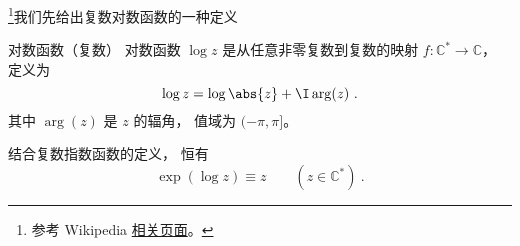 

\footnote{参考 Wikipedia \href{https://en.wikipedia.org/wiki/Complex_logarithm}{相关页面}。}我们先给出复数对数函数的一种定义
\begin{definition}{对数函数（复数）}
对数函数 $\log z$ 是从任意非零复数到复数的映射 $f:\mathbb C^*\to \mathbb C$， 定义为
\begin{equation}
\log z = \log\abs{z} + \I \arg(z)~.
\end{equation}
其中 $\arg(z)$ 是 $z$ 的辐角， 值域为 $(-\pi, \pi]$。
\end{definition}

结合复数指数函数的定义， 恒有
\begin{equation}
\exp(\log z) \equiv z \qquad (z \in \mathbb C^*)~.
\end{equation}
\begin{equation}

\end{equation}

